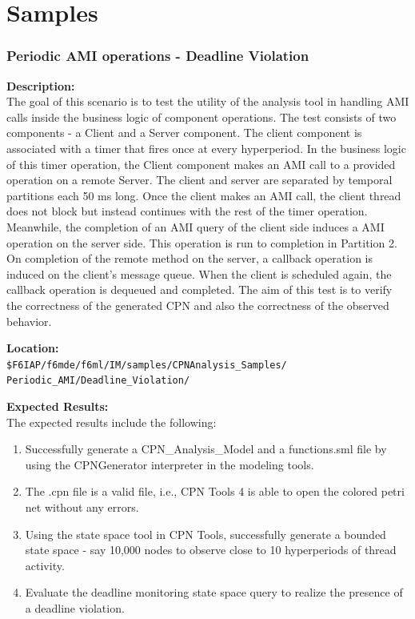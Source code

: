\chapter{Samples}

\subsection{Periodic AMI operations - Deadline Violation}

\label{sec:AMI}
\noindent\textbf{Description:}\\
The goal of this scenario is to test the utility of the analysis tool in handling AMI calls inside the business logic of component operations. The test consists of two components - a Client and a Server component. The client component is associated with a timer that fires once at every hyperperiod. In the business logic of this timer operation, the Client component makes an AMI call to a provided operation on a remote Server. The client and server are separated by temporal partitions each 50 ms long. Once the client makes an AMI call, the client thread does not block but instead continues with the rest of the timer operation. Meanwhile, the completion of an AMI query of the client side induces a AMI operation on the server side. This operation is run to completion in Partition 2. On completion of the remote method on the server, a callback operation is induced on the client's message queue. When the client is scheduled again, the callback operation is dequeued and completed. The aim of this test is to verify the correctness of the generated CPN and also the correctness of the observed behavior. 

\noindent\textbf{Location:}\\
\texttt{\$F6IAP/f6mde/f6ml/IM/samples/CPNAnalysis\_Samples/ \\ Periodic\_AMI/Deadline\_Violation/}


\noindent\textbf{Expected Results:}\\
The expected results include the following: 
\begin{enumerate}
\item Successfully generate a CPN\_Analysis\_Model and a functions.sml file by using the CPNGenerator interpreter in the modeling tools.
\item The .cpn file is a valid file, i.e., CPN Tools 4 is able to open the colored petri net without any errors.
\item Using the state space tool in CPN Tools, successfully generate a bounded state space - say 10,000 nodes to observe close to 10 hyperperiods of thread activity.
\item Evaluate the deadline monitoring state space query to realize the presence of a deadline violation.
\end{enumerate}

